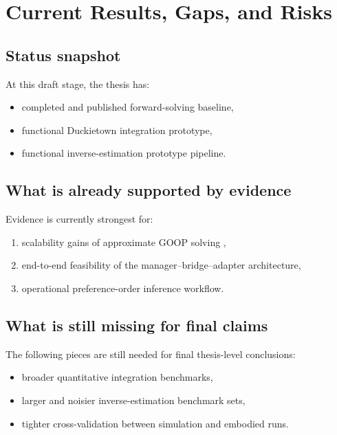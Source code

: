 \chapter{Current Results, Gaps, and Risks}

\section{Status snapshot}

At this draft stage, the thesis has:

\begin{itemize}
    \item completed and published forward-solving baseline,
    \item functional Duckietown integration prototype,
    \item functional inverse-estimation prototype pipeline.
\end{itemize}

\section{What is already supported by evidence}

Evidence is currently strongest for:

\begin{enumerate}
    \item scalability gains of approximate GOOP solving
    \cite{delasheras:2025},
    \item end-to-end feasibility of the manager--bridge--adapter architecture,
    \item operational preference-order inference workflow.
\end{enumerate}

\section{What is still missing for final claims}

The following pieces are still needed for final thesis-level conclusions:

\begin{itemize}
    \item broader quantitative integration benchmarks,
    \item larger and noisier inverse-estimation benchmark sets,
    \item tighter cross-validation between simulation and embodied runs.
\end{itemize}

